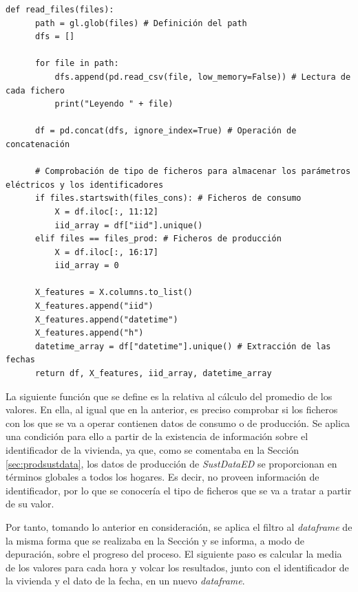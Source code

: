 \vspace{3mm}

\begin{lstlisting}[style=Python, caption={Función de lectura de los ficheros}]
  def read_files(files):
      path = gl.glob(files) # Definición del path
      dfs = []

      for file in path:
          dfs.append(pd.read_csv(file, low_memory=False)) # Lectura de cada fichero
          print("Leyendo " + file)

      df = pd.concat(dfs, ignore_index=True) # Operación de concatenación

      # Comprobación de tipo de ficheros para almacenar los parámetros eléctricos y los identificadores
      if files.startswith(files_cons): # Ficheros de consumo
          X = df.iloc[:, 11:12]
          iid_array = df["iid"].unique()
      elif files == files_prod: # Ficheros de producción
          X = df.iloc[:, 16:17]
          iid_array = 0

      X_features = X.columns.to_list()
      X_features.append("iid")
      X_features.append("datetime")
      X_features.append("h")
      datetime_array = df["datetime"].unique() # Extracción de las fechas
      return df, X_features, iid_array, datetime_array
\end{lstlisting}

\vspace{3mm}

La siguiente función que se define es la relativa al cálculo del promedio de los valores. En ella, al igual que en la anterior, es preciso comprobar si los ficheros con los que se va a operar contienen datos de consumo o de producción. Se aplica una condición para ello a partir de la existencia de información sobre el identificador de la vivienda, ya que, como se comentaba en la Sección \ref{sec:prodsustdata}, los datos de producción de \textit{SustDataED} se proporcionan en términos globales a todos los hogares. Es decir, no proveen información de identificador, por lo que se conocería el tipo de ficheros que se va a tratar a partir de su valor.

\vspace{3mm}

Por tanto, tomando lo anterior en consideración, se aplica el filtro al \textit{dataframe} de la misma forma que se realizaba en la Sección \label{sec:datasamples} y se informa, a modo de depuración, sobre el progreso del proceso. El siguiente paso es calcular la media de los valores para cada hora y volcar los resultados, junto con el identificador de la vivienda y el dato de la fecha, en un nuevo \textit{dataframe}.

